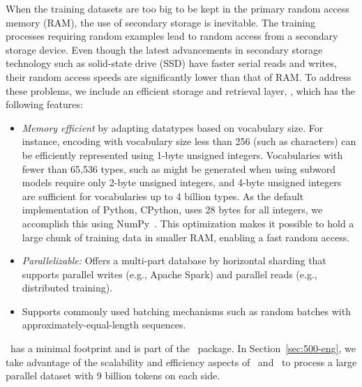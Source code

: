 When the training datasets are too big to be kept in the primary random access memory (RAM), the use of secondary storage is inevitable.
The training processes requiring random examples lead to random access from a secondary storage device.
Even though the latest advancements in secondary storage technology such as solid-state drive (SSD) have faster serial reads and writes, their random access speeds are significantly lower than that of RAM. 
To address these problems, we include an efficient storage and retrieval layer, \nldb, which has the following features:
\begin{itemize}[noitemsep,topsep=0pt,leftmargin=4mm]
  \item \textit{Memory efficient} by adapting datatypes based on vocabulary size. For instance, encoding with vocabulary size less than 256 (such as characters) can be efficiently represented using 1-byte unsigned integers. Vocabularies with fewer than 65,536 types, such as might be generated when using subword models \cite{sennrich-etal-2016-bpe} require only 2-byte unsigned integers, and 4-byte unsigned integers are sufficient for vocabularies up to 4 billion types. 
As the default implementation of Python, CPython, uses 28 bytes for all integers, we accomplish this using NumPy~\cite{harris2020numpy}. This optimization makes it possible to hold a large chunk of training data in smaller RAM, enabling a fast random access.
  \item \textit{Parallelizable:} Offers a multi-part database by horizontal sharding that supports parallel writes (e.g., Apache Spark) and parallel reads (e.g., distributed training).
  \item Supports commonly used batching mechanisms such as random batches with approximately-equal-length sequences.
\end{itemize}

\nldb\ has a minimal footprint and is part of the \nlcodec\ package.
In Section~\ref{sec:500-eng}, we take advantage of the scalability and efficiency aspects of \nlcodec\ and \nldb\ to process a large parallel dataset with 9 billion tokens on each side.


